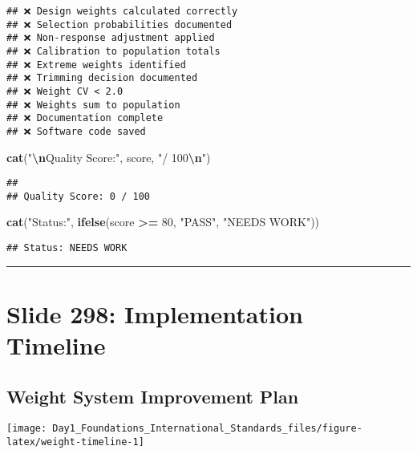 \documentclass[
]{article}
\newenvironment{Shaded}{\begin{snugshade}}{\end{snugshade}}
\newcommand{\DecValTok}[1]{\textcolor[rgb]{0.00,0.00,0.81}{#1}}
\newcommand{\FunctionTok}[1]{\textcolor[rgb]{0.13,0.29,0.53}{\textbf{#1}}}
\newcommand{\NormalTok}[1]{#1}
\newcommand{\SpecialCharTok}[1]{\textcolor[rgb]{0.81,0.36,0.00}{\textbf{#1}}}
\newcommand{\StringTok}[1]{\textcolor[rgb]{0.31,0.60,0.02}{#1}}
\begin{document}
\begin{verbatim}
## ❌ Design weights calculated correctly 
## ❌ Selection probabilities documented 
## ❌ Non-response adjustment applied 
## ❌ Calibration to population totals 
## ❌ Extreme weights identified 
## ❌ Trimming decision documented 
## ❌ Weight CV < 2.0 
## ❌ Weights sum to population 
## ❌ Documentation complete 
## ❌ Software code saved
\end{verbatim}

\begin{Shaded}
\begin{Highlighting}[]
\FunctionTok{cat}\NormalTok{(}\StringTok{"}\SpecialCharTok{\textbackslash{}n}\StringTok{Quality Score:"}\NormalTok{, score, }\StringTok{"/ 100}\SpecialCharTok{\textbackslash{}n}\StringTok{"}\NormalTok{)}
\end{Highlighting}
\end{Shaded}

\begin{verbatim}
## 
## Quality Score: 0 / 100
\end{verbatim}

\begin{Shaded}
\begin{Highlighting}[]
\FunctionTok{cat}\NormalTok{(}\StringTok{"Status:"}\NormalTok{, }\FunctionTok{ifelse}\NormalTok{(score }\SpecialCharTok{\textgreater{}=} \DecValTok{80}\NormalTok{, }\StringTok{"PASS"}\NormalTok{, }\StringTok{"NEEDS WORK"}\NormalTok{))}
\end{Highlighting}
\end{Shaded}

\begin{verbatim}
## Status: NEEDS WORK
\end{verbatim}

\begin{center}\rule{0.5\linewidth}{0.5pt}\end{center}

\section{Slide 298: Implementation
Timeline}\label{slide-298-implementation-timeline}

\subsection{Weight System Improvement
Plan}\label{weight-system-improvement-plan}

\texttt{[image: Day1\_Foundations\_International\_Standards\_files/figure-latex/weight-timeline-1]}
\end{document}
